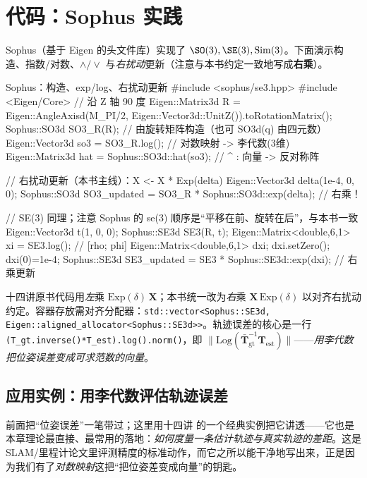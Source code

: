 \section{代码：Sophus 实践}
\label{sec:sophus}

Sophus（基于 Eigen 的头文件库）实现了 $\SO(3),\SE(3),\mathrm{Sim}(3)$。下面演示构造、指数/对数、$\wedge/\vee$ 与\emph{右扰动}更新（注意与本书约定一致地写成\textbf{右乘}）。

\begin{codebox}[C++]{Sophus：构造、exp/log、右扰动更新}
#include <sophus/se3.hpp>
#include <Eigen/Core>
// 沿 Z 轴 90 度
Eigen::Matrix3d R = Eigen::AngleAxisd(M_PI/2, Eigen::Vector3d::UnitZ()).toRotationMatrix();
Sophus::SO3d SO3_R(R);                 // 由旋转矩阵构造（也可 SO3d(q) 由四元数）
Eigen::Vector3d so3 = SO3_R.log();     // 对数映射 -> 李代数(3维)
Eigen::Matrix3d hat = Sophus::SO3d::hat(so3);   // ^ : 向量 -> 反对称阵

// 右扰动更新（本书主线）：X <- X * Exp(delta)
Eigen::Vector3d delta(1e-4, 0, 0);
Sophus::SO3d SO3_updated = SO3_R * Sophus::SO3d::exp(delta);   // 右乘！

// SE(3) 同理；注意 Sophus 的 se(3) 顺序是“平移在前、旋转在后”，与本书一致
Eigen::Vector3d t(1, 0, 0);
Sophus::SE3d SE3(R, t);
Eigen::Matrix<double,6,1> xi = SE3.log();        // [rho; phi]
Eigen::Matrix<double,6,1> dxi; dxi.setZero(); dxi(0)=1e-4;
Sophus::SE3d SE3_updated = SE3 * Sophus::SE3d::exp(dxi);       // 右乘更新
\end{codebox}

\begin{note}
十四讲原书代码用\emph{左}乘 $\mathrm{Exp}(\delta)\,\mathbf{X}$；本书统一改为\emph{右}乘 $\mathbf{X}\,\mathrm{Exp}(\delta)$ 以对齐右扰动约定。容器存放需对齐分配器：\texttt{std::vector<Sophus::SE3d, Eigen::aligned\_allocator<Sophus::SE3d>>}。轨迹误差的核心是一行 \texttt{(T\_gt.inverse()*T\_est).log().norm()}，即 $\|\mathrm{Log}(\bar{\mathbf{T}}_{\text{gt}}^{-1}\mathbf{T}_{\text{est}})\|$——\emph{用李代数把位姿误差变成可求范数的向量}。
\end{note}

\subsection{应用实例：用李代数评估轨迹误差}
\label{sec:traj-error}

前面把“位姿误差”一笔带过；这里用十四讲\cite{gaoxiang2019slam14} 的一个经典实例把它讲透——它也是本章理论最直接、最常用的落地：\emph{如何度量一条估计轨迹与真实轨迹的差距}。这是 SLAM/里程计论文里评测精度的标准动作，而它之所以能干净地写出来，正是因为我们有了\emph{对数映射}这把“把位姿差变成向量”的钥匙。

